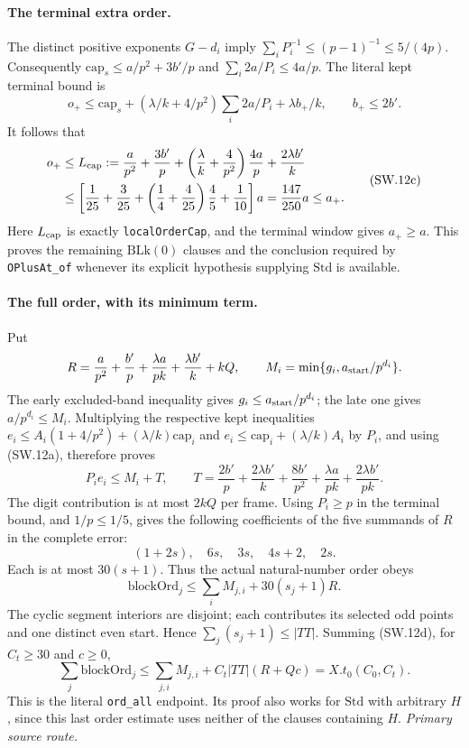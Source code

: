 \documentclass[11pt,a4paper]{article}
\numberwithin{equation}{section}
\theoremstyle{remark}\newtheorem{remark}[theorem]{Remark}
\begin{document}
\paragraph{The terminal extra order.}
The distinct positive exponents $G-d_i$ imply
$\sum_iP_i^{-1}\le(p-1)^{-1}\le5/(4p)$.
Consequently $\mathrm{cap}_s\le a/p^2+3b'/p$ and
$\sum_i2a/P_i\le4a/p$. The literal kept terminal bound is
\[
 o_+\le\mathrm{cap}_s+
  (\lambda/k+4/p^2)\sum_i2a/P_i+\lambda b_+/k,
 \qquad b_+\le2b'.
\]
It follows that
\[
\begin{aligned}
 o_+&\le L_{\rm cap}:=
  \frac a{p^2}+\frac{3b'}p+
  \left(\frac\lambda k+\frac4{p^2}\right)\frac{4a}p
  +\frac{2\lambda b'}k\\
 &\le\left[\frac1{25}+\frac3{25}
       +\left(\frac14+\frac4{25}\right)\frac45+\frac1{10}\right]a
   =\frac{147}{250}a\le a_+.
\end{aligned}
\tag{SW.12c}
\]
Here $L_{\rm cap}$ is exactly \texttt{localOrderCap}, and the terminal
window gives $a_+\ge a$. This proves the remaining $\mathrm{BLk}(0)$
clauses and the conclusion required by \texttt{OPlusAt\_of} whenever
its explicit hypothesis supplying $\mathrm{Std}$ is available.

\paragraph{The full order, with its minimum term.}
Put
\[
 R=\frac a{p^2}+\frac{b'}p+\frac{\lambda a}{pk}
     +\frac{\lambda b'}k+kQ,
 \qquad M_i=\min\{g_i,a_{\rm start}/p^{d_i}\}.
\]
The early excluded-band inequality gives
$g_i\le a_{\rm start}/p^{d_i}$; the late one gives
$a/p^{d_i}\le M_i$.
Multiplying the respective kept inequalities
$e_i\le A_i(1+4/p^2)+(\lambda/k)\mathrm{cap}_i$ and
$e_i\le\mathrm{cap}_i+(\lambda/k)A_i$ by $P_i$, and using
(SW.12a), therefore proves
\[
 P_i e_i\le M_i+T,\qquad
 T=\frac{2b'}p+\frac{2\lambda b'}k+\frac{8b'}{p^2}
       +\frac{\lambda a}{pk}+\frac{2\lambda b'}{pk}.
\]
The digit contribution is at most $2kQ$ per frame. Using $P_i\ge p$
in the terminal bound, and $1/p\le1/5$, gives the following coefficients
of the five summands of $R$ in the complete error:
\[
 (1+2s),\quad6s,\quad3s,\quad4s+2,\quad2s.
\]
Each is at most $30(s+1)$. Thus the actual natural-number order obeys
\[
 \mathrm{blockOrd}_j\le\sum_iM_{j,i}+30(s_j+1)R.
 \tag{SW.12d}
\]
The cyclic segment interiors are disjoint; each contributes its selected
odd points and one distinct even start. Hence
$\sum_j(s_j+1)\le|TT|$. Summing (SW.12d), for $C_t\ge30$ and $c\ge0$,
\[
 \sum_j\mathrm{blockOrd}_j
 \le\sum_{j,i}M_{j,i}+C_t|TT|(R+Qc)=X.t_0(C_0,C_t).
 \tag{SW.12e}
\]
This is the literal \texttt{ord\_all} endpoint. Its proof also works for
$\mathrm{Std}$ with arbitrary $H$, since this last order estimate uses
neither of the clauses containing $H$.
\noindent\textit{Primary source route.}\cite{segment-numerics-actual}
\end{document}
